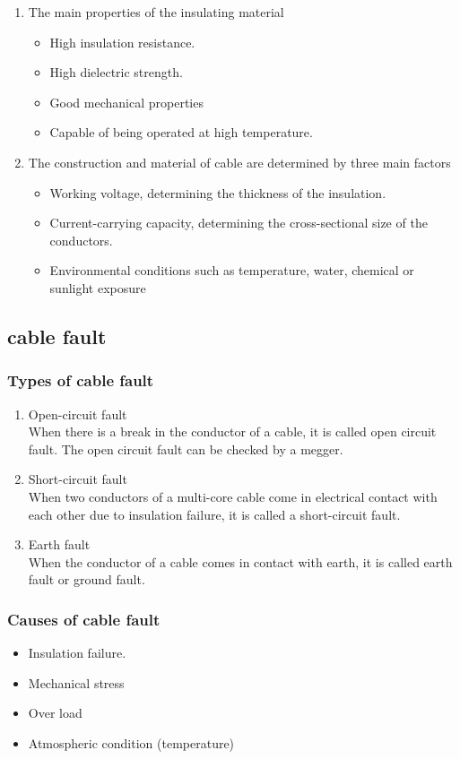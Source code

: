 \documentclass[12pt,fleqn]{book} %
\begin{document}
  
  \begin{enumerate}
   \item  The main properties of the insulating material
   \begin{itemize}
    \item 	High insulation resistance.
    \item High dielectric strength.
    \item	Good mechanical properties
    \item Capable of being operated at high temperature.
\end{itemize}
\item  The construction and material of cable are determined by three main factors
 \begin{itemize}
    \item Working voltage, determining the thickness of the insulation.
    \item Current-carrying capacity, determining the cross-sectional size of the conductors.
    \item	Environmental conditions such as temperature, water, chemical or sunlight exposure
\end{itemize}
	 \end{enumerate}
	 \subsection{  cable fault}
	 \subsubsection{Types of cable fault}
	 \begin{enumerate}
   \item Open-circuit fault
   \\ When there is a break in the conductor of a cable, it is called open circuit fault. The open circuit fault can be checked by a megger.
   \item Short-circuit fault
   \\ When two conductors of a multi-core cable come in electrical contact with each other due to insulation failure, it is called a short-circuit fault.
   \item Earth fault
  \\  When the conductor of a cable comes in contact with earth, it is called earth fault or ground fault.
     \end{enumerate}
     \subsubsection{Causes of cable fault}
     \begin{itemize}
    \item 	Insulation failure.
    \item Mechanical stress
    \item	Over load
    \item Atmospheric condition (temperature)
\end{itemize}
\end{document}
